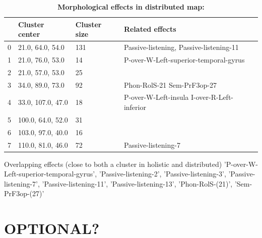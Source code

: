 \begin{table}
\begin{tabular}{llll}
\toprule
{} &       Cluster center & Cluster size &                                    Related effects \\
\midrule
0 &   21.0, 64.0, 54.0 &          131 &        Passive-listening, Passive-listening-11 \\
1 &   21.0, 76.0, 53.0 &           14 &  P-over-W-Left-superior-temporal-gyrus \\
2 &   21.0, 57.0, 53.0 &           25 &                                                  \\
3 &   34.0, 89.0, 73.0 &           92 &     Phon-RolS-21 Sem-PrF3op-27 \\
4 &  33.0, 107.0, 47.0 &           18 &  P-over-W-Left-insula I-over-R-Left-inferior \\
5 &  100.0, 64.0, 52.0 &           31 &                                                  \\
6 &  103.0, 97.0, 40.0 &           16 &                                                  \\
7 &  110.0, 81.0, 46.0 &           72 &                              Passive-listening-7 \\
\bottomrule
\end{tabular}
\caption{\textbf{Morphological effects in distributed map:}}
\label{table:distributed_effects}
\end{table}



Overlapping effects (close to both a cluster in holistic and distributed)
'P-over-W-Left-superior-temporal-gyrus',
'Passive-listening-2',
'Passive-listening-3',
'Passive-listening-7',
'Passive-listening-11',
'Passive-listening-13',
'Phon-RolS-(21)',
'Sem-PrF3op-(27)'





\section{OPTIONAL?}

